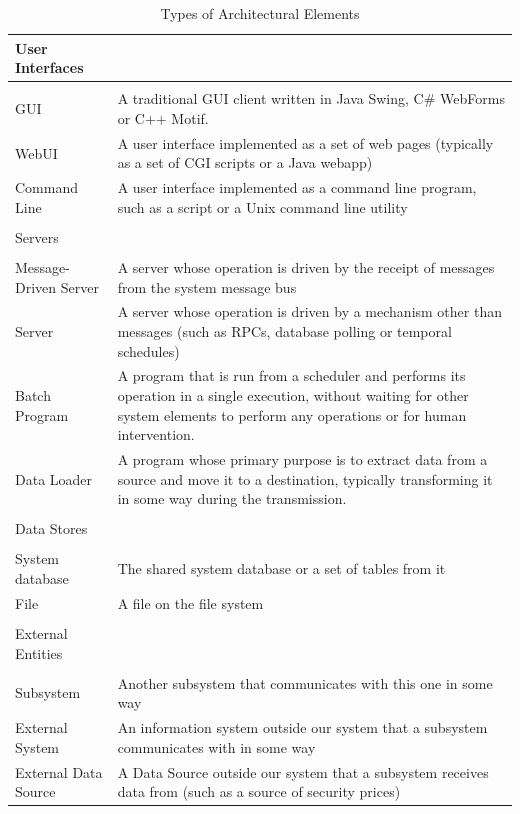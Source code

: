   
\begin{table}
\caption{Types of Architectural Elements}
\label{table:archelemtypes}
\footnotesize

\begin{tabular}{| l p{10cm} |}
\hline
User Interfaces \\
\hline
& \\
GUI   & A traditional GUI client written in Java Swing, C\# WebForms or C++ Motif. \\
WebUI & A user interface implemented as a set of web pages (typically as a set of CGI scripts or a Java webapp) \\
Command Line & A user interface implemented as a command line program, such as a script or a Unix command line utility \\
& \\
\hline
Servers & \\
\hline
& \\
Message-Driven Server & A server whose operation is driven by the receipt of messages from the system message bus \\
Server                &  A server whose operation is driven by a mechanism other than messages (such as RPCs, database polling or temporal schedules) \\
Batch Program         & A program that is run from a scheduler and performs its operation in a single execution, without waiting for other system elements to perform any operations or for human intervention. \\
Data Loader           & A program whose primary purpose is to extract data from a source and move it to a destination, typically transforming it in some way during the transmission. \\
& \\
\hline
Data Stores  \\
\hline
& \\
System database   &  The shared system database or a set of tables from it \\
File              & A file on the file system \\
& \\
\hline
External Entities  \\
\hline
& \\
Subsystem            & Another subsystem that communicates with this one in some way \\
External System      & An information system outside our system that a subsystem communicates with in some way \\
External Data Source & A Data Source outside our system that a subsystem receives data from (such as a source of security prices) \\
\hline
\end{tabular}
\end{table}

